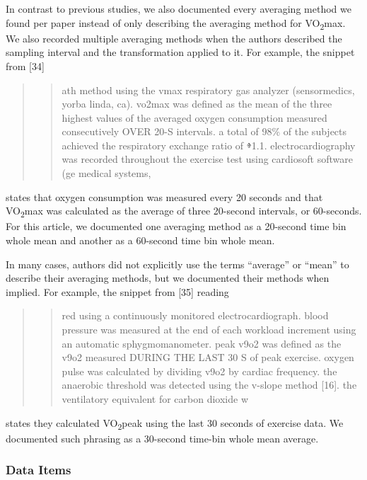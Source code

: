 \documentclass[
  letterpaper,
  DIV=11,
  numbers=noendperiod]{scrartcl}
\begin{document}
In contrast to previous studies, we also documented every averaging
method we found per paper instead of only describing the averaging
method for VO\textsubscript{2}max. We also recorded multiple averaging
methods when the authors described the sampling interval and the
transformation applied to it. For example, the snippet from {[}34{]}

\begin{quote}
\begin{quote}
ath method using the vmax respiratory gas analyzer (sensormedics, yorba
linda, ca). vo2max was deﬁned as the mean of the three highest values of
the averaged oxygen consumption measured consecutively OVER 20-S
intervals. a total of 98\% of the subjects achieved the respiratory
exchange ratio of ⱖ1.1. electrocardiography was recorded throughout the
exercise test using cardiosoft software (ge medical systems,
\end{quote}
\end{quote}

states that oxygen consumption was measured every 20 seconds and that
VO\textsubscript{2}max was calculated as the average of three 20-second
intervals, or 60-seconds. For this article, we documented one averaging
method as a 20-second time bin whole mean and another as a 60-second
time bin whole mean.

In many cases, authors did not explicitly use the terms ``average'' or
``mean'' to describe their averaging methods, but we documented their
methods when implied. For example, the snippet from {[}35{]} reading

\begin{quote}
\begin{quote}
red using a continuously monitored electrocardiograph. blood pressure
was measured at the end of each workload increment using an automatic
sphygmomanometer. peak v9o2 was deﬁned as the v9o2 measured DURING THE
LAST 30 S of peak exercise. oxygen pulse was calculated by dividing v9o2
by cardiac frequency. the anaerobic threshold was detected using the
v-slope method {[}16{]}. the ventilatory equivalent for carbon dioxide w
\end{quote}
\end{quote}

states they calculated VO\textsubscript{2}peak using the last 30 seconds
of exercise data. We documented such phrasing as a 30-second time-bin
whole mean average.

\subsubsection{Data Items}\label{data-items}
\end{document}
